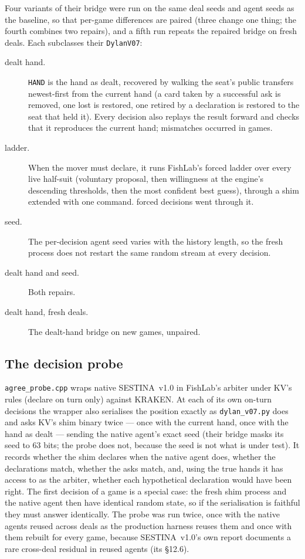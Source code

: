 \documentclass[11pt]{article}
\newcommand{\code}[1]{\texttt{#1}}
\newcommand{\sestina}{\mbox{SESTINA v1.0}}
\begin{document}
Four variants of their bridge were run on the same deal seeds and agent seeds as the baseline, so
that per-game differences are paired (three change one thing; the fourth combines two repairs), and a
fifth run repeats the repaired bridge on fresh deals. Each subclasses their \code{DylanV07}:
\begin{description}
\item[dealt hand.] \code{HAND} is the hand as dealt, recovered by walking the seat's public transfers
      newest-first from the current hand (a card taken by a successful ask is removed, one lost is
      restored, one retired by a declaration is restored to the seat that held it). Every decision also
      replays the result forward and checks that it reproduces the current hand;
      \kcVDealtHandMismatch{} mismatches occurred in \kcVDealtGames{} games.
\item[ladder.] When the mover must declare, it runs FishLab's forced ladder over every live half-suit
      (voluntary proposal, then willingness at the engine's descending thresholds, then the most
      confident best guess), through a shim extended with one command. \kcVLadderCalls{} forced
      decisions went through it.
\item[seed.] The per-decision agent seed varies with the history length, so the fresh process does not
      restart the same random stream at every decision.
\item[dealt hand and seed.] Both repairs.
\item[dealt hand, fresh deals.] The dealt-hand bridge on \kcVDealtBigGames{} new games, unpaired.
\end{description}

\subsection{The decision probe}
\label{sec:m-probe}

\code{agree\_probe.cpp} wraps native \sestina{} in FishLab's arbiter under KV's rules (declare on
turn only) against KRAKEN. At each of its own on-turn decisions the wrapper also serialises the position
exactly as \code{dylan\_v07.py} does and asks KV's shim binary twice --- once with the current hand,
once with the hand as dealt --- sending the native agent's exact seed (their bridge masks its seed to
63 bits; the probe does not, because the seed is not what is under test). It records whether
the shim declares when the native agent does, whether the declarations match, whether the asks match,
and, using the true hands it has access to as the arbiter, whether each hypothetical declaration
would have been right. The first decision of a game is a special case: the fresh shim process and the
native agent then have identical random state, so if the serialisation is faithful they must answer
identically. The probe was run twice, once with the native agents reused across deals as the
production harness reuses them and once with them rebuilt for every game, because \sestina{}'s own
report documents a rare cross-deal residual in reused agents (its \S12.6).
\end{document}
